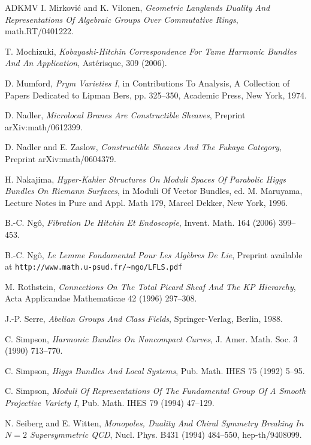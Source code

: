 \documentclass[11pt,a4paper]{article}
\begin{document}
\begin{thebibliography}{ADKMV}
 I. Mirkovi\'c and K. Vilonen, \emph{Geometric Langlands Duality And Representations Of Algebraic Groups Over Commutative Rings}, math.RT/0401222.

 T. Mochizuki, \emph{Kobayashi-Hitchin Correspondence For Tame Harmonic Bundles And An Application}, Ast\'erisque, 309 (2006).

 D. Mumford, \emph{Prym Varieties I}, in Contributions To Analysis, A Collection of Papers Dedicated to Lipman Bers, pp. 325--350, Academic Press, New York, 1974.

 D. Nadler, \emph{Microlocal Branes Are Constructible Sheaves}, Preprint arXiv:math/0612399.

 D. Nadler and E. Zaslow, \emph{Constructible Sheaves And The Fukaya Category}, Preprint arXiv:math/0604379.

 H. Nakajima, \emph{Hyper-Kahler Structures On Moduli Spaces Of Parabolic Higgs Bundles On Riemann Surfaces}, in Moduli Of Vector Bundles, ed. M. Maruyama, Lecture Notes in Pure and Appl. Math 179, Marcel Dekker, New York, 1996.

 B.-C. Ng\^o, \emph{Fibration De Hitchin Et Endoscopie}, Invent. Math. 164 (2006) 399--453.

 B.-C. Ng\^o, \emph{Le Lemme Fondamental Pour Les Alg\`ebres De Lie}, Preprint available at \texttt{http://www.math.u-psud.fr/\textasciitilde ngo/LFLS.pdf}

 M. Rothstein, \emph{Connections On The Total Picard Sheaf And The KP Hierarchy}, Acta Applicandae Mathematicae 42 (1996) 297--308.

 J.-P. Serre, \emph{Abelian Groups And Class Fields}, Springer-Verlag, Berlin, 1988.

 C. Simpson, \emph{Harmonic Bundles On Noncompact Curves}, J. Amer. Math. Soc. 3 (1990) 713--770.

 C. Simpson, \emph{Higgs Bundles And Local Systems}, Pub. Math. IHES 75 (1992) 5--95.

 C. Simpson, \emph{Moduli Of Representations Of The Fundamental Group Of A Smooth Projective Variety I}, Pub. Math. IHES 79 (1994) 47--129.

 N. Seiberg and E. Witten, \emph{Monopoles, Duality And Chiral Symmetry Breaking In $N=2$ Supersymmetric QCD}, Nucl. Phys. B431 (1994) 484--550, hep-th/9408099.


\end{thebibliography}
\end{document}
